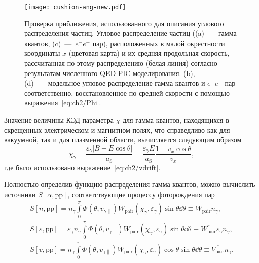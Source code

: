 \begin{figure}[ht]
    \texttt{[image: cushion-ang-new.pdf]}
    \caption[Проверка приближения, использованного для описания углового распределения частиц.]{\label{fig:ch2/sec3/ang}
    Проверка приближения, использованного для описания углового распределения частиц. Угловое распределение частиц ((a)~---~гамма-квантов, (c)~---~$e^-e^+$ пар), расположенных в малой окрестности координаты $x$ (цветовая карта) и их средняя продольная скорость, рассчитанная по этому распределению (белая линия) согласно результатам численного QED-PIC моделирования. (b), (d)~---~модельное угловое распределение гамма-квантов и $e^-e^+$ пар соответственно, восстановленное по средней скорости с помощью выражения~\eqref{eq:ch2/Phi}. }
\end{figure}

Значение величины КЭД параметра $\chi$ для гамма-квантов, находящихся в скрещенных электрическом и магнитном полях, что справедливо как для вакуумной, так и для плазменной области, вычисляется следующим образом
\begin{equation}
    \chi_\gamma = \frac{\varepsilon_\gamma \left| B - E\cos\theta \right|}{a_\mathrm{S}} = \frac{\varepsilon_\gamma E }{a_\mathrm{S}}\frac{1- v_x\cos\theta }{v_x},
\end{equation}
где было использовано выражение~\eqref{eq:ch2/vdrift}.

Полностью определив функцию распределения гамма-квантов, можно вычислить источники $S[\alpha, \mathrm{pp}]$, соответствующие процессу фоторождения пар
\begin{align}
    S[n,\mathrm{pp}] =  n_\gamma\int\limits_0^\pi \Phi(\theta, v_{\gamma\parallel}) W_\mathrm{pair}(\chi_\gamma,\varepsilon_\gamma) \sin\theta \dd\theta \equiv \overline{W_\mathrm{pair}} n_\gamma , \\
    S[\varepsilon,\mathrm{pp}] = \varepsilon_\gamma n_\gamma\int\limits_0^\pi \Phi(\theta, v_{\gamma\parallel}) W_\mathrm{pair}(\chi_\gamma,\varepsilon_\gamma) \sin\theta \dd\theta \equiv \overline{W_\mathrm{pair}} \varepsilon_\gamma n_\gamma ,\\
    S[v,\mathrm{pp}] = n_\gamma\int\limits_0^\pi \Phi(\theta, v_{\gamma\parallel}) W_\mathrm{pair}(\chi_\gamma,\varepsilon_\gamma)\cos\theta \sin\theta \dd\theta \equiv \overline{V_\mathrm{pair}} n_\gamma .
\end{align}

